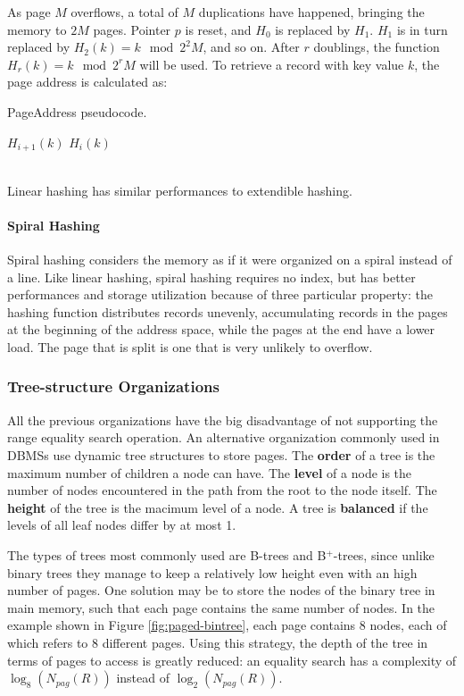 As page $M$ overflows, a total of $M$ duplications have happened, bringing the memory to $2M$ pages. Pointer $p$ is reset, and $H_0$ is replaced by $H_1$. $H_1$ is in turn replaced by $H_2(k) = k \mod 2^2 M$, and so on. After $r$ doublings, the function $H_r(k) = k \mod 2^r M$ will be used. To retrieve a record with key value $k$, the page address is calculated as:
\begin{algorithm}
\caption{PageAddress pseudocode.}
\begin{algorithmic}[1]
        \State $H_{i+1}(k)$
    \Else  
        \State $H_i(k)$
    \EndIf
\end{algorithmic}
\end{algorithm}
\\Linear hashing has similar performances to extendible hashing.

\paragraph{Spiral Hashing}

Spiral hashing considers the memory as if it were organized on a spiral instead of a line. Like linear hashing, spiral hashing requires no index, but has better performances and storage utilization because of three particular property:
the hashing function distributes records unevenly, accumulating records in the pages at the beginning of the address space, while the pages at the end have a lower load. The page that is split is one that is very unlikely to overflow.

\subsubsection{Tree-structure Organizations}

All the previous organizations have the big disadvantage of not supporting the range equality search operation. An alternative organization commonly used in DBMSs use dynamic tree structures to store pages. The \textbf{order} of a tree is the maximum number of children a node can have. The \textbf{level} of a node is the number of nodes encountered in the path from the root to the node itself. The \textbf{height} of the tree is the macimum level of a node. A tree is \textbf{balanced} if the levels of all leaf nodes differ by at most 1.

The types of trees most commonly used are B-trees and B$^+$-trees, since unlike binary trees they manage to keep a relatively low height even with an high number of pages. One solution may be to store the nodes of the binary tree in main memory, such that each page contains the same number of nodes. In the example shown in Figure \ref{fig:paged-bintree}, each page contains 8 nodes, each of which refers to 8 different pages. Using this strategy, the depth of the tree in terms of pages to access is greatly reduced: an equality search has a complexity of $\log_8 (N_{pag}(R))$ instead of $\log_2 (N_{pag}(R))$.

